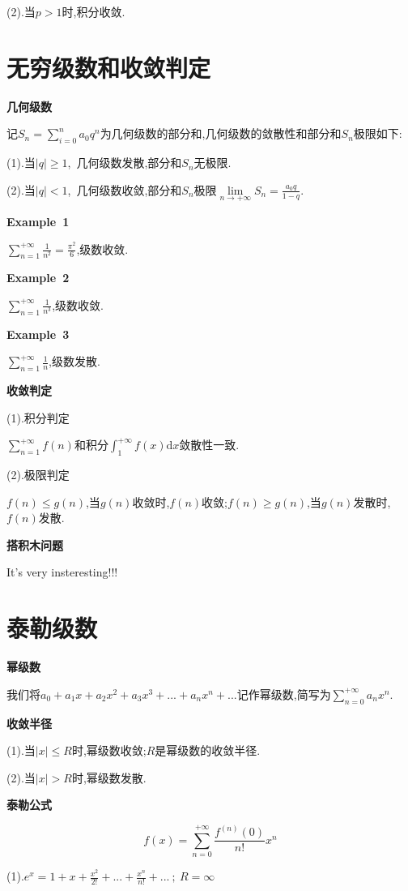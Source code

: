 \documentclass[oneside]{book}
\begin{document}
	(2).当$p>1$时,积分收敛.
	
	\chapter{无穷级数和收敛判定}
	\textbf{几何级数}
	
	记$S_{n}=\sum_{i=0}^{n}a_{0}q^{n}$为几何级数的部分和,几何级数的敛散性和部分和$S_{n}$极限如下:
	
	(1).当$|q|\geq 1$,\ 几何级数发散,部分和$S_{n}$无极限.
	
	(2).当$|q|< 1$,\ 几何级数收敛,部分和$S_{n}$极限$\lim\limits_{n\rightarrow +\infty}S_{n}=\frac{a_{0}q}{1-q}$.
	
	\textbf{Example\ 1}
	
	$\sum_{n=1}^{+\infty}\frac{1}{n^{2}}=\frac{\pi^{2}}{6}$,级数收敛.
	
	\textbf{Example\ 2}
	
	$\sum_{n=1}^{+\infty}\frac{1}{n^{3}}$,级数收敛.
	
	\textbf{Example\ 3}
	
	$\sum_{n=1}^{+\infty}\frac{1}{n}$,级数发散.
	
	\textbf{收敛判定}
	
	(1).积分判定
	
	$\sum_{n=1}^{+\infty}f(n)$和积分$\int_{1}^{+\infty}f(x)\mathrm{d}x$敛散性一致.
	
	(2).极限判定
	
	$f(n)\leq g(n)$,当$g(n)$收敛时,$f(n)$收敛;$f(n)\geq g(n)$,当$g(n)$发散时,$f(n)$发散.
	
	\textbf{搭积木问题}
	
	It's very insteresting!!!
	\chapter{泰勒级数}
	\textbf{幂级数}
	
	我们将$a_{0}+a_{1}x+a_{2}x^{2}+a_{3}x^{3}+...+a_{n}x^{n}+...$记作幂级数,简写为$\sum_{n=0}^{+\infty}a_{n}x^{n}$.
	
	\textbf{收敛半径}
	
	(1).当$|x|\leq R$时,幂级数收敛;$R$是幂级数的收敛半径.
	
	(2).当$|x|>R$时,幂级数发散.
	
	\textbf{泰勒公式}
	
	$$f(x)=\sum_{n=0}^{+\infty}\frac{f^{(n)}(0)}{n!}x^{n}$$
	
	(1).$e^{x}=1+x+\frac{x^{2}}{2!}+...+\frac{x^{n}}{n!}+...\ ;\ R=\infty$
	
	\hspace{\fill}\
	
\end{document}

